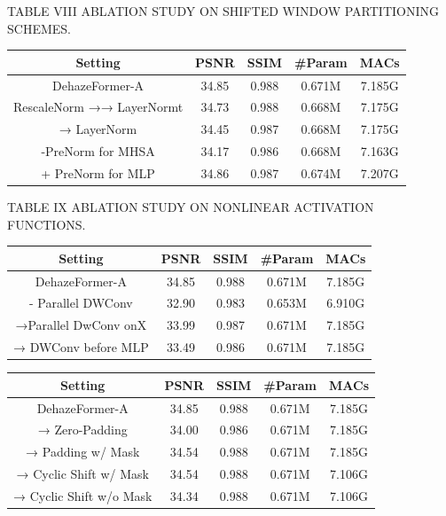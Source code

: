 TABLE VIII ABLATION STUDY ON SHIFTED WINDOW PARTITIONING SCHEMES.


\begin{table}[htbp]
\centering
\begin{tabular}{|c|c|c|c|c|}\hline
Setting & PSNR & SSIM & #Param & MACs \\ \hline
DehazeFormer-A & 34.85 & 0.988 & 0.671M & 7.185G \\ \hline
RescaleNorm →→ LayerNormt & 34.73 & 0.988 & 0.668M & 7.175G \\ \hline
→ LayerNorm & 34.45 & 0.987 & 0.668M & 7.175G \\ \hline
-PreNorm for MHSA & 34.17 & 0.986 & 0.668M & 7.163G \\ \hline
+ PreNorm for MLP & 34.86 & 0.987 & 0.674M & 7.207G \\ \hline
\end{tabular}\end{table}

TABLE IX ABLATION STUDY ON NONLINEAR ACTIVATION FUNCTIONS.


\begin{table}[htbp]
\centering
\begin{tabular}{|c|c|c|c|c|}\hline
Setting & PSNR & SSIM & #Param & MACs \\ \hline
DehazeFormer-A & 34.85 & 0.988 & 0.671M & 7.185G \\ \hline
- Parallel DWConv & 32.90 & 0.983 & 0.653M & 6.910G \\ \hline
→Parallel DwConv onX & 33.99 & 0.987 & 0.671M & 7.185G \\ \hline
→ DWConv before MLP & 33.49 & 0.986 & 0.671M & 7.185G \\ \hline
\end{tabular}\end{table}

\begin{table}[htbp]
\centering
\begin{tabular}{|c|c|c|c|c|}\hline
Setting & PSNR & SSIM & #Param & MACs \\ \hline
DehazeFormer-A & 34.85 & 0.988 & 0.671M & 7.185G \\ \hline
→ Zero-Padding & 34.00 & 0.986 & 0.671M & 7.185G \\ \hline
→ Padding w/ Mask & 34.54 & 0.988 & 0.671M & 7.185G \\ \hline
→ Cyclic Shift w/ Mask & 34.54 & 0.988 & 0.671M & 7.106G \\ \hline
→ Cyclic Shift w/o Mask & 34.34 & 0.988 & 0.671M & 7.106G \\ \hline
\end{tabular}\end{table}

